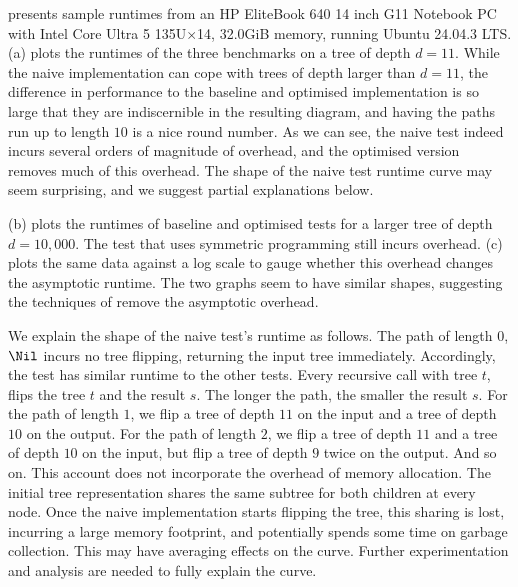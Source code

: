 
 presents sample runtimes from an HP EliteBook 640 14 inch G11
Notebook PC with Intel Core Ultra 5 135U$\times$14, 32.0GiB memory,
running Ubuntu 24.04.3 LTS. (a)
plots the runtimes of the three benchmarks on a tree of depth $d =
11$. While the naive implementation can cope with trees of depth
larger than $d = 11$, the difference in performance to the baseline
and optimised implementation is so large that they are indiscernible
in the resulting diagram, and having the paths run up to length $10$
is a nice round number. As we can see, the naive test indeed incurs
several orders of magnitude of overhead, and the optimised version
removes much of this overhead.  The shape of the naive test runtime
curve may seem surprising, and we suggest partial explanations below.

(b) plots the runtimes of baseline and optimised
tests for a larger tree of depth $d=10,000$. The test that uses
symmetric programming still incurs overhead. (c)
plots the same data against a log scale to gauge whether
this overhead changes the asymptotic runtime. The two graphs seem to
have similar shapes, suggesting the techniques of  remove the asymptotic overhead.

We explain the shape of the naive test's runtime as follows. The path
of length $0$, $\Nil$ incurs no tree flipping, returning the input
tree immediately. Accordingly, the test has similar runtime to the
other tests. Every recursive call with tree $t$, flips the tree $t$
and the result $s$. The longer the path, the smaller the result $s$.
For the path of length $1$, we flip a tree of depth $11$ on the input
and a tree of depth $10$ on the output. For the path of length $2$, we
flip a tree of depth $11$ and a tree of depth $10$ on the input, but
flip a tree of depth $9$ twice on the output. And so on. This account
does not incorporate the overhead of memory allocation.  The initial
tree representation shares the same subtree for both children at every
node. Once the naive implementation starts flipping the tree, this
sharing is lost, incurring a large memory footprint, and potentially
spends some time on garbage collection. This may have averaging
effects on the curve. Further experimentation and analysis are needed
to fully explain the curve.

